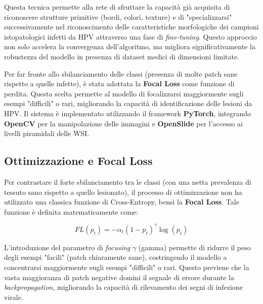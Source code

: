 Questa tecnica permette alla rete di sfruttare la capacità già acquisita di riconoscere strutture primitive (bordi, colori, texture) e di "specializzarsi" successivamente nel riconoscimento delle caratteristiche morfologiche dei campioni istopatologici infetti da HPV attraverso una fase di \textit{fine-tuning}. Questo approccio non solo accelera la convergenza dell'algoritmo, ma migliora significativamente la robustezza del modello in presenza di dataset medici di dimensioni limitate.



Per far fronte allo sbilanciamento delle classi (presenza di molte patch sane rispetto a quelle infette), è stata adottata la \textbf{Focal Loss} come funzione di perdita. Questa scelta permette al modello di focalizzarsi maggiormente sugli esempi "difficili" o rari, migliorando la capacità di identificazione delle lesioni da HPV. Il sistema è implementato utilizzando il framework \textbf{PyTorch}, integrando \textbf{OpenCV} per la manipolazione delle immagini e \textbf{OpenSlide} per l'accesso ai livelli piramidali delle WSI.


\subsection{Ottimizzazione e Focal Loss}

Per contrastare il forte sbilanciamento tra le classi (con una netta prevalenza di tessuto sano rispetto a quello lesionato), il processo di ottimizzazione non ha utilizzato una classica funzione di Cross-Entropy, bensì la \textbf{Focal Loss}. Tale funzione è definita matematicamente come:


\begin{equation}
    FL(p_t) = -\alpha_t (1 - p_t)^\gamma \log(p_t)
\end{equation}


L'introduzione del parametro di \textit{focusing} $\gamma$ (gamma) permette di ridurre il peso degli esempi "facili" (patch chiaramente sane), costringendo il modello a concentrarsi maggiormente sugli esempi "difficili" o rari. Questo previene che la vasta maggioranza di patch negative domini il segnale di errore durante la \textit{backpropagation}, migliorando la capacità di rilevamento dei segni di infezione virale. 